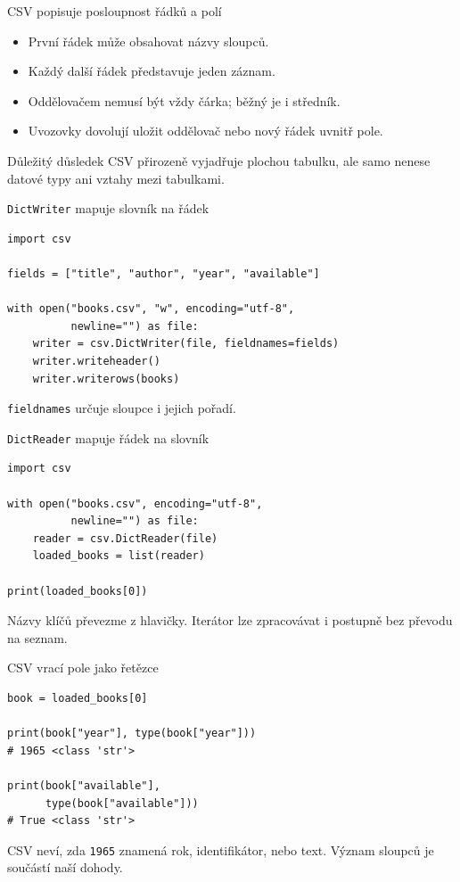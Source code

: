 \documentclass[aspectratio=169]{beamer}
\begin{document}
\begin{frame}{CSV popisuje posloupnost řádků a polí}
  \begin{itemize}
    \item První řádek může obsahovat názvy sloupců.
    \item Každý další řádek představuje jeden záznam.
    \item Oddělovačem nemusí být vždy čárka; běžný je i středník.
    \item Uvozovky dovolují uložit oddělovač nebo nový řádek uvnitř pole.
  \end{itemize}
  \begin{block}{Důležitý důsledek}
    CSV přirozeně vyjadřuje plochou tabulku, ale samo nenese datové typy ani vztahy mezi tabulkami.
  \end{block}
\end{frame}

\begin{frame}[fragile]{\texttt{DictWriter} mapuje slovník na řádek}
\begin{lstlisting}[style=pythonSmall]
import csv

fields = ["title", "author", "year", "available"]

with open("books.csv", "w", encoding="utf-8",
          newline="") as file:
    writer = csv.DictWriter(file, fieldnames=fields)
    writer.writeheader()
    writer.writerows(books)
\end{lstlisting}
  \texttt{fieldnames} určuje sloupce i jejich pořadí.
\end{frame}

\begin{frame}[fragile]{\texttt{DictReader} mapuje řádek na slovník}
\begin{lstlisting}[style=python]
import csv

with open("books.csv", encoding="utf-8",
          newline="") as file:
    reader = csv.DictReader(file)
    loaded_books = list(reader)

print(loaded_books[0])
\end{lstlisting}
  Názvy klíčů převezme z hlavičky. Iterátor lze zpracovávat i postupně bez převodu na seznam.
\end{frame}

\begin{frame}[fragile]{CSV vrací pole jako řetězce}
\begin{lstlisting}[style=python]
book = loaded_books[0]

print(book["year"], type(book["year"]))
# 1965 <class 'str'>

print(book["available"],
      type(book["available"]))
# True <class 'str'>
\end{lstlisting}
  CSV neví, zda \texttt{1965} znamená rok, identifikátor, nebo text. Význam sloupců je součástí naší dohody.
\end{frame}
\end{document}
